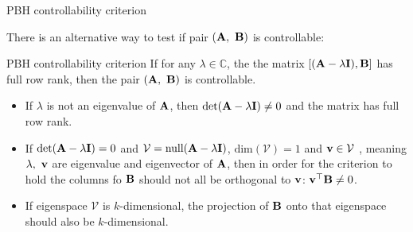 \documentclass{beamer}
\begin{document}
\begin{frame}{PBH controllability criterion}
	\begin{flushleft}
		
		There is an alternative way to test if pair $(\mathbf{A}, \ \mathbf{B})$ is controllable:
		
		\begin{block}{PBH controllability criterion}
			If for any $\lambda \in \mathbb{C}$, the the matrix $[ (\mathbf{A}-\lambda\mathbf{I}), \mathbf{B}]$ has full row rank, then the pair $(\mathbf{A}, \ \mathbf{B})$ is controllable.
		\end{block}
		
		\begin{itemize}
			\item If $\lambda$ is not an eigenvalue of $\mathbf{A}$, then $\text{det}(\mathbf{A}-\lambda\mathbf{I}) \neq 0$ and the matrix has full row rank.
			
			\item If $\text{det}(\mathbf{A}-\lambda\mathbf{I}) = 0$ and $\mathcal{V} = \text{null}(\mathbf{A}-\lambda\mathbf{I})$, $\text{dim}(\mathcal{V}) = 1$ and $\mathbf{v} \in \mathcal{V}$ , meaning $\lambda, \ \mathbf{v}$ are eigenvalue and eigenvector of $\mathbf{A}$, then in order for the criterion to hold the columns fo $\mathbf{B}$ should not all be orthogonal to $\mathbf{v}$: $\mathbf{v}^\top \mathbf{B} \neq 0$.
			
			\item If eigenspace $\mathcal{V}$ is $k$-dimensional, the projection of $\mathbf{B}$ onto that eigenspace should also be $k$-dimensional.
			
		\end{itemize}
		
	\end{flushleft}
\end{frame}




\myqrframe
\end{document}

